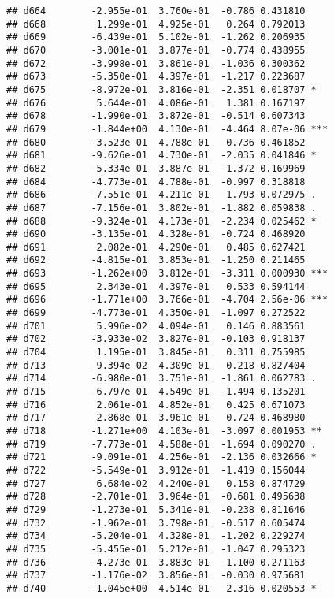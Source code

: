 \documentclass[
]{article}
\begin{document}
\begin{verbatim}
## d664        -2.955e-01  3.760e-01  -0.786 0.431810    
## d668         1.299e-01  4.925e-01   0.264 0.792013    
## d669        -6.439e-01  5.102e-01  -1.262 0.206935    
## d670        -3.001e-01  3.877e-01  -0.774 0.438955    
## d672        -3.998e-01  3.861e-01  -1.036 0.300362    
## d673        -5.350e-01  4.397e-01  -1.217 0.223687    
## d675        -8.972e-01  3.816e-01  -2.351 0.018707 *  
## d676         5.644e-01  4.086e-01   1.381 0.167197    
## d678        -1.990e-01  3.872e-01  -0.514 0.607343    
## d679        -1.844e+00  4.130e-01  -4.464 8.07e-06 ***
## d680        -3.523e-01  4.788e-01  -0.736 0.461852    
## d681        -9.626e-01  4.730e-01  -2.035 0.041846 *  
## d682        -5.334e-01  3.887e-01  -1.372 0.169969    
## d684        -4.773e-01  4.788e-01  -0.997 0.318818    
## d686        -7.551e-01  4.211e-01  -1.793 0.072975 .  
## d687        -7.156e-01  3.802e-01  -1.882 0.059838 .  
## d688        -9.324e-01  4.173e-01  -2.234 0.025462 *  
## d690        -3.135e-01  4.328e-01  -0.724 0.468920    
## d691         2.082e-01  4.290e-01   0.485 0.627421    
## d692        -4.815e-01  3.853e-01  -1.250 0.211465    
## d693        -1.262e+00  3.812e-01  -3.311 0.000930 ***
## d695         2.343e-01  4.397e-01   0.533 0.594144    
## d696        -1.771e+00  3.766e-01  -4.704 2.56e-06 ***
## d699        -4.773e-01  4.350e-01  -1.097 0.272522    
## d701         5.996e-02  4.094e-01   0.146 0.883561    
## d702        -3.933e-02  3.827e-01  -0.103 0.918137    
## d704         1.195e-01  3.845e-01   0.311 0.755985    
## d713        -9.394e-02  4.309e-01  -0.218 0.827404    
## d714        -6.980e-01  3.751e-01  -1.861 0.062783 .  
## d715        -6.797e-01  4.549e-01  -1.494 0.135201    
## d716         2.061e-01  4.852e-01   0.425 0.671073    
## d717         2.868e-01  3.961e-01   0.724 0.468980    
## d718        -1.271e+00  4.103e-01  -3.097 0.001953 ** 
## d719        -7.773e-01  4.588e-01  -1.694 0.090270 .  
## d721        -9.091e-01  4.256e-01  -2.136 0.032666 *  
## d722        -5.549e-01  3.912e-01  -1.419 0.156044    
## d727         6.684e-02  4.240e-01   0.158 0.874729    
## d728        -2.701e-01  3.964e-01  -0.681 0.495638    
## d729        -1.273e-01  5.341e-01  -0.238 0.811646    
## d732        -1.962e-01  3.798e-01  -0.517 0.605474    
## d734        -5.204e-01  4.328e-01  -1.202 0.229274    
## d735        -5.455e-01  5.212e-01  -1.047 0.295323    
## d736        -4.273e-01  3.883e-01  -1.100 0.271163    
## d737        -1.176e-02  3.856e-01  -0.030 0.975681    
## d740        -1.045e+00  4.514e-01  -2.316 0.020553 *  

\end{verbatim}
\end{document}
